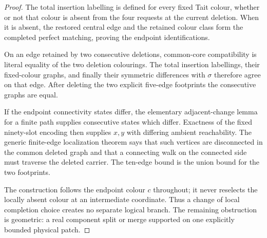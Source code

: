 \begin{proof}
The total insertion labelling is defined for every fixed Tait colour, whether
or not that colour is absent from the four requests at the current deletion.
When it is absent, the restored central edge and the retained colour class
form the completed perfect matching, proving the endpoint identifications.

On an edge retained by two consecutive deletions, common-core compatibility
is literal equality of the two deletion colourings.  The total insertion
labellings, their fixed-colour graphs, and finally their symmetric differences
with $\sigma$ therefore agree on that edge.  After deleting the two explicit
five-edge footprints the consecutive graphs are equal.

If the endpoint connectivity states differ, the elementary adjacent-change
lemma for a finite path supplies consecutive states which differ.  Exactness
of the fixed ninety-slot encoding then supplies $x,y$ with differing ambient
reachability.  The generic finite-edge localization theorem says that such
vertices are disconnected in the common deleted graph and that a connecting
walk on the connected side must traverse the deleted carrier.  The ten-edge
bound is the union bound for the two footprints.

The construction follows the endpoint colour $c$ throughout; it never
reselects the locally absent colour at an intermediate coordinate.  Thus a
change of local completion choice creates no separate logical branch.  The
remaining obstruction is geometric: a real component split or merge supported
on one explicitly bounded physical patch.
\end{proof}

